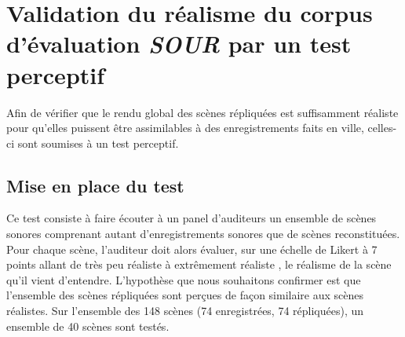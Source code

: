\section{Validation du réalisme du corpus d'évaluation \textit{SOUR} par un test perceptif}\label{sec:test}

Afin de vérifier que le rendu global des scènes répliquées est suffisamment réaliste pour qu'elles puissent être assimilables à des enregistrements faits en ville, celles-ci sont soumises à un test perceptif.

\subsection{Mise en place du test}

Ce test consiste à faire écouter à un panel d'auditeurs un ensemble de scènes sonores comprenant autant d'enregistrements sonores que de scènes reconstituées. Pour chaque scène, l'auditeur doit alors évaluer, sur une échelle de Likert à 7 points allant de \og très peu réaliste \fg{} à \og extrêmement réaliste \fg{}, le réalisme de la scène qu'il vient d'entendre. L'hypothèse que nous souhaitons confirmer est que l'ensemble des scènes répliquées sont perçues de façon similaire aux scènes réalistes.
Sur l'ensemble des 148 scènes (74 enregistrées, 74 répliquées), un ensemble de 40 scènes sont testés.
